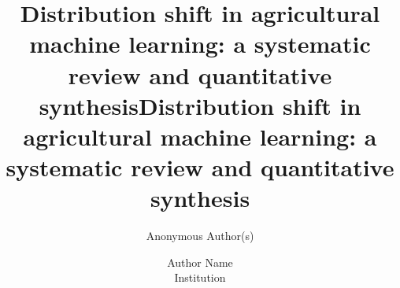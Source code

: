 \documentclass[10pt,twocolumn]{article}
\title{Distribution shift in agricultural machine learning: a systematic review and quantitative synthesis}
\author{Anonymous Author(s)}
\title{Distribution shift in agricultural machine learning: a systematic review and quantitative synthesis}
\author{Author Name\\ Institution}
\begin{document}
\maketitle

\begin{abstract}

\end{abstract}











\end{document}
